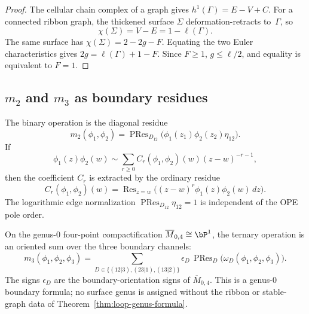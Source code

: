 \begin{proof}
The cellular chain complex of a graph gives
\(h^1(\Gamma)=E-V+C\).  For a connected ribbon graph, the thickened
surface \(\Sigma\) deformation-retracts to~\(\Gamma\), so
\[
\chi(\Sigma)=V-E=1-\ell(\Gamma).
\]
The same surface has \(\chi(\Sigma)=2-2g-F\).  Equating the two
Euler characteristics gives \(2g=\ell(\Gamma)+1-F\).  Since
\(F\geq 1\), \(g\leq \ell/2\), and equality is equivalent to
\(F=1\).
\end{proof}

\subsection{\texorpdfstring{$m_2$ and $m_3$ as boundary residues}{m2 and m3 as boundary residues}}

\begin{example}
\label{ex:m2-tree-level}
The binary operation is the diagonal residue
\[
m_2(\phi_1,\phi_2)
=\operatorname{PRes}_{D_{12}}
\bigl(\phi_1(z_1)\phi_2(z_2)\eta_{12}\bigr).
\]
If
\[
\phi_1(z)\phi_2(w)
\sim \sum_{r\geq 0}C_r(\phi_1,\phi_2)(w)(z-w)^{-r-1},
\]
then the coefficient \(C_r\) is extracted by the ordinary residue
\[
C_r(\phi_1,\phi_2)(w)
=\operatorname{Res}_{z=w}
\bigl((z-w)^r\phi_1(z)\phi_2(w)\,dz\bigr).
\]
The logarithmic edge normalization
\(\operatorname{PRes}_{D_{12}}\eta_{12}=1\) is independent of the
OPE pole order.
\end{example}

\begin{example}
\label{ex:m3-boundary}
On the genus-\(0\) four-point compactification
\(\overline{M}_{0,4}\cong\bP^1\), the ternary operation is an oriented
sum over the three boundary channels:
\[
m_3(\phi_1,\phi_2,\phi_3)
=\sum_{D\in\{(12|3),(23|1),(13|2)\}}
\epsilon_D\,\operatorname{PRes}_D
\bigl(\omega_D(\phi_1,\phi_2,\phi_3)\bigr).
\]
The signs \(\epsilon_D\) are the boundary-orientation signs of
\(\overline{M}_{0,4}\).  This is a genus-\(0\) boundary formula; no
surface genus is assigned without the ribbon or stable-graph data of
Theorem~\ref{thm:loop-genus-formula}.
\end{example}

